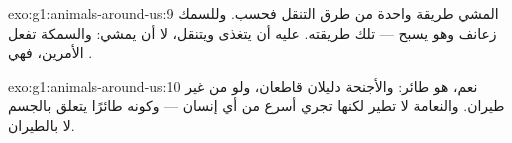 \begin{solution}{exo:g1:animals-around-us:9}
المشي طريقة واحدة من طرق التنقل فحسب. وللسمك زعانف وهو يسبح ---
تلك طريقته.  عليه أن يتغذى ويتنقل، لا أن يمشي: والسمكة
تفعل الأمرين، فهي .
\end{solution}

\begin{solution}{exo:g1:animals-around-us:10}
نعم، هو طائر:  والأجنحة دليلان قاطعان، ولو من غير طيران.
والنعامة لا تطير لكنها تجري أسرع من أي إنسان --- وكونه طائرًا
يتعلق بالجسم لا بالطيران.
\end{solution}
